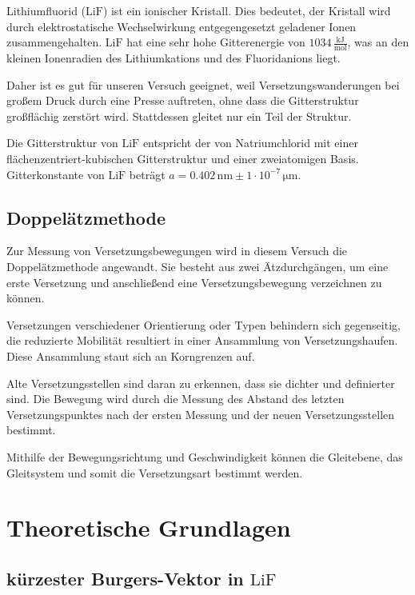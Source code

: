 \documentclass[12pt,a4paper]{scrartcl}
\numberwithin{equation}{section} %
\renewcommand{\[}{} %
\renewcommand{\]}{\noindent} %
\begin{document}
Lithiumfluorid (\(\mathrm{LiF}\)) ist ein ionischer Kristall. Dies
bedeutet, der Kristall wird durch elektrostatische Wechselwirkung
entgegengesetzt geladener Ionen zusammengehalten. \(\mathrm{LiF}\)
hat eine sehr hohe Gitterenergie von \(1034\mathrm{\,\frac{kJ}{mol}}\),
was an den kleinen Ionenradien des Lithiumkations und des Fluoridanions
liegt.

Daher ist es gut für unseren Versuch geeignet, weil
Versetzungswanderungen bei großem Druck durch eine Presse auftreten,
ohne dass die Gitterstruktur großflächig zerstört wird. Stattdessen
gleitet nur ein Teil der Struktur.

Die Gitterstruktur von \(\mathrm{LiF}\) entspricht der von
Natriumchlorid mit einer flächenzentriert-kubischen Gitterstruktur und
einer zweiatomigen Basis. Gitterkonstante von \(\mathrm{LiF}\) beträgt
\(a=0.402\mathrm{\,nm}\pm 1 \cdot 10^{-7} \mathrm{\, \mu m}\). \cite{Uni}

\hypertarget{doppeluxe4tzmethode}{%
\subsection{Doppelätzmethode}\label{doppeluxe4tzmethode}}

Zur Messung von Versetzungsbewegungen wird in diesem Versuch die
Doppelätzmethode angewandt. Sie besteht aus zwei Ätzdurchgängen, um eine
erste Versetzung und anschließend eine Versetzungsbewegung verzeichnen
zu können.

Versetzungen verschiedener Orientierung oder Typen behindern sich
gegenseitig, die reduzierte Mobilität resultiert in einer Ansammlung von
Versetzungshaufen. Diese Ansammlung staut sich an Korngrenzen auf.

Alte Versetzungsstellen sind daran zu erkennen, dass sie dichter
und definierter sind. Die Bewegung wird durch die Messung des Abstand
des letzten Versetzungspunktes nach der ersten Messung und der neuen
Versetzungsstellen bestimmt.

Mithilfe der Bewegungsrichtung und Geschwindigkeit können die
Gleitebene, das Gleitsystem und somit die Versetzungsart bestimmt
werden.

\newpage
\hypertarget{theoretische-grundlagen}{%
\section{Theoretische Grundlagen}\label{theoretische-grundlagen}}

\hypertarget{kuxfcrzester-burgers-vektor-in-mathrmlif}{%
\subsection{\texorpdfstring{kürzester Burgers-Vektor in
\(\mathrm{LiF}\)}{kürzester Burgers-Vektor in \textbackslash mathrm\{LiF\}}}\label{kuxfcrzester-burgers-vektor-in-mathrmlif}}
\end{document}
